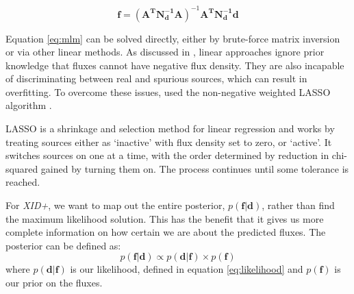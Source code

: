 \documentclass[useAMS,usenatbib]{mnras}
\begin{document}
\begin{equation}
\mathbf{f}=(\mathbf{A^TN_d^{-1}A})^{-1}\mathbf{A^TN_d^{-1}d}\label{eq:mlm}
\end{equation}

Equation \ref{eq:mlm} can be solved directly, either by brute-force matrix inversion or via other linear methods. As discussed in \cite{Roseboom:2010, Roseboom:2011, and Wang:2014}, linear approaches ignore prior knowledge that fluxes cannot have negative flux density.%
 They are also incapable of discriminating between real and spurious sources, which can result in overfitting. To overcome these issues, \cite{Roseboom:2011} used the non-negative weighted LASSO algorithm \citep{Tibshirani:1996, Zou:2006, terBraak:2010}.

LASSO is a shrinkage and selection method for linear regression and works by treating sources either as `inactive' with flux density set to zero, or `active'. It switches sources on one at a time, with the order determined by reduction in chi-squared gained by turning them on. The process continues until some tolerance is reached.

%

For \emph{XID+}, we want to map out the entire posterior, $p(\mathbf{f}|\mathbf{d})$, rather than find the maximum likelihood solution. This has the benefit that it gives us more complete information on how certain we are about the predicted fluxes. The posterior can be defined as:
\begin{equation}
p(\mathbf{f}|\mathbf{d}) \propto p(\mathbf{d}|\mathbf{f}) \times p(\mathbf{f})
\end{equation}
where $p(\mathbf{d}|\mathbf{f})$ is our likelihood, defined in equation \ref{eq:likelihood} and $p(\mathbf{f})$ is our prior on the fluxes. 
\end{document}
